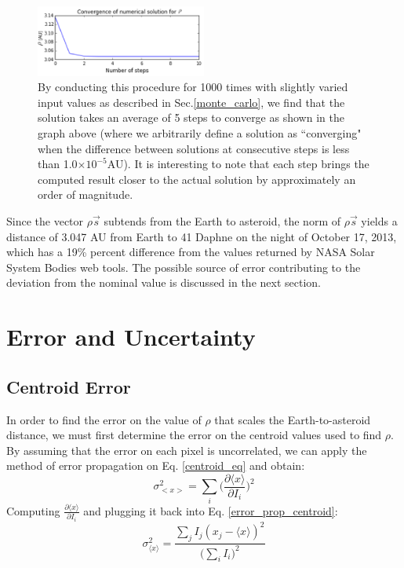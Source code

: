 \documentclass[authoryear, 12pt,5p, times]{elsarticle}
\begin{document}
    	\begin{figure}[h!]
\includegraphics[width=0.5\textwidth]{figures/convergence_example}
\caption{ By conducting this procedure for 1000 times with slightly varied input values as described in Sec.\ref{monte_carlo}, we find that the solution takes an average of 5 steps to converge as shown in the graph above  (where we arbitrarily define a solution as ``converging" when the difference between solutions at consecutive steps is less than 1.0$\times10^{-5}$AU). It is interesting to note that each step brings the computed result closer to the actual solution by approximately an order of magnitude. }
\label{convergence_example}
\end{figure}
  
Since the vector $\rho \vec{s}$ subtends from the Earth to asteroid, the norm of  $\rho \vec{s}$ yields a distance of 3.047 AU from Earth to 41 Daphne on the night of October 17, 2013, which has a 19\% percent difference from the values returned by NASA Solar System Bodies web tools. The possible source of error  contributing to the deviation from the nominal value is discussed in the next section. 
\section{Error and Uncertainty}
\subsection{Centroid Error}
\label{centroid_error}
In order to find the error on the value of $\rho$ that scales the Earth-to-asteroid distance, we must first determine the error on the centroid values used to find $\rho$. 
By assuming that the error on each pixel is uncorrelated, we can apply the method of error propagation on Eq. \ref{centroid_eq} and obtain:
\begin{equation}
\sigma^2_{<x>}=\sum_{i} \Bigg(\frac{\partial \langle x\rangle}{\partial I_i}\Bigg)^2
\label{error_prop_centroid}
\end{equation} 
Computing $\frac{\partial \langle x\rangle}{\partial I_i}$ and plugging it back into Eq. \ref{error_prop_centroid}: 
\begin{equation}
\sigma^2_{\langle x\rangle}=\frac{\sum\limits_{j}I_j (x_j-\langle x\rangle)^2 }{\Big(\sum \limits_{i} I_i\Big)^2}
\end{equation}
\end{document}
